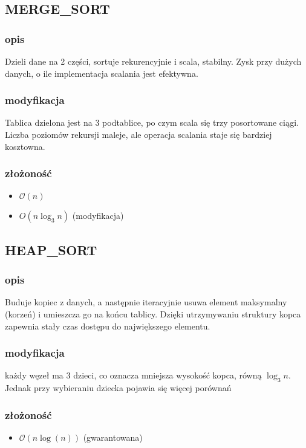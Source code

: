 \documentclass{article}
\begin{document}
\subsection{MERGE\_SORT}
\subsubsection{opis}
Dzieli dane na 2 części, sortuje rekurencyjnie i scala, stabilny. Zysk przy dużych danych, o ile implementacja scalania jest efektywna.
\subsubsection{modyfikacja}
Tablica dzielona jest na 3 podtablice, po czym scala się trzy posortowane ciągi. Liczba poziomów rekursji maleje, ale operacja scalania staje się bardziej kosztowna.
\subsubsection{złożoność}
\begin{itemize}
\item $\mathcal{O}(n)$
\item $O(n \log_{3} n)$ (modyfikacja)
\end{itemize}

\subsection{HEAP\_SORT}
\subsubsection{opis}
Buduje kopiec z danych, a następnie iteracyjnie usuwa element maksymalny (korzeń) i umieszcza go na końcu tablicy. Dzięki utrzymywaniu struktury kopca zapewnia stały czas dostępu do największego elementu.

\subsubsection{modyfikacja}
każdy węzeł ma 3 dzieci, co oznacza mniejsza wysokość kopca, równą $ \log_{3} n$. Jednak przy wybieraniu dziecka pojawia się więcej porównań

\subsubsection{złożoność}
\begin{itemize}
    \item $\mathcal{O}(n \log(n))$ (gwarantowana)
\end{itemize}
\end{document}
